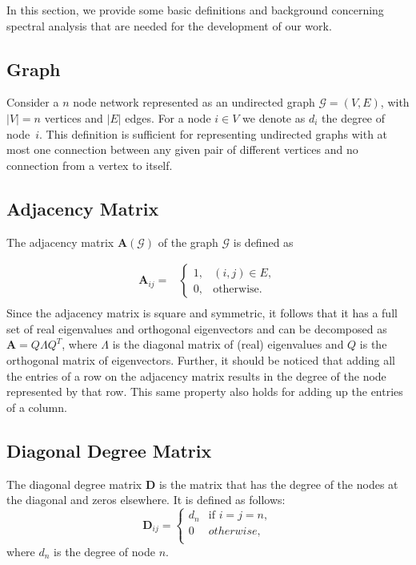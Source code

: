 \documentclass[conference,fleqn]{IEEEtran}
\begin{document}
In this section, we provide some basic definitions and  background concerning spectral analysis 
that are needed for the development of our work.

\subsection{Graph}
\label{subsec:Grp}
Consider a $n$ node network represented as an undirected graph $\mathcal{G} = (V,E)$,
with $|V|=n$ vertices and $|E|$ edges. For a node $i \in V$ we denote as $d_i$ the degree
of node~$i$. This definition is sufficient for representing undirected graphs with at most 
one connection between any given pair of different vertices and no connection from a vertex 
to itself. 


\subsection{Adjacency Matrix}
\label{subsec:AdjMatrix}
The adjacency matrix $\mathbf{A}(\mathcal{G})$ of the graph $\mathcal{G}$ is defined as

\begin{equation}
\label{ADM}
\begin{split}
	\mathbf{A}_{ij} =&
	\begin{cases}
		1, & (i,j) \in E,\\
		0, & \text{otherwise.}
	\end{cases}\\
\end{split}
\end{equation}
Since the adjacency matrix is square and symmetric, it follows that it has a full set of real 
eigenvalues and orthogonal eigenvectors and can be decomposed as \mbox{$ \mathbf{A} = Q \Lambda Q^T $}, 
where $\Lambda$ is the diagonal matrix of (real) eigenvalues and $Q$ is the orthogonal matrix of eigenvectors. 
Further, it should be noticed that adding all the entries of a row on the adjacency matrix results 
in the degree of the node represented by that row. This same property also holds for adding up the entries of a column.

\subsection{Diagonal Degree Matrix}
\label{subsec:DDgMatrix}
The diagonal degree matrix $\mathbf{D}$ is the matrix that has the degree of the nodes at the diagonal and zeros elsewhere. It is 
defined as follows:
\begin{equation}
\label{DDM}
 \mathbf{D}_{ij} = 
 \begin{cases}
   d_n & \text{if } i=j=n, \\
   0 & otherwise,\\
 \end{cases}
\end{equation}
where $d_n$ is the degree of node $n$.
\end{document}
